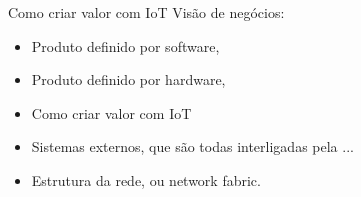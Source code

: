 
\begin{frame}{Como criar valor com IoT}
    Visão de negócios:

    \begin{itemize}
        \item Produto definido por software,
        \item Produto definido por hardware,
        \item Como criar valor com IoT
        \item Sistemas externos, que são todas interligadas pela ...
        \item Estrutura da rede, ou network fabric.
    \end{itemize}
\end{frame}
